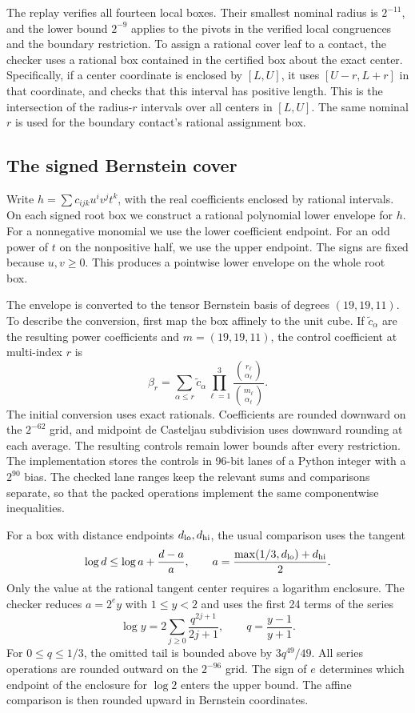 \documentclass[11pt,letterpaper]{article}
\theoremstyle{remark}
\begin{document}
The replay verifies all fourteen local boxes. Their smallest
nominal radius is \(2^{-11}\), and the lower bound \(2^{-9}\)
applies to the pivots in the verified local congruences and the
boundary restriction. To assign a rational cover leaf to a
contact, the checker uses a rational box contained in the
certified box about the exact center. Specifically, if a center
coordinate is enclosed by \([L,U]\), it uses \([U-r,L+r]\)
in that coordinate, and checks that this interval has positive
length. This is the intersection of the radius-\(r\) intervals
over all centers in \([L,U]\). The same nominal \(r\) is used
for the boundary contact's rational assignment box.

\subsection{The signed Bernstein cover}

Write \(h=\sum c_{ijk}u^iv^jt^k\), with the real coefficients
enclosed by rational intervals. On each signed root box we
construct a rational polynomial lower envelope for \(h\). For
a nonnegative monomial we use the lower coefficient endpoint.
For an odd power of \(t\) on the nonpositive half, we use the
upper endpoint. The signs are fixed because \(u,v\ge0\).
This produces a pointwise lower envelope on the whole root box.

The envelope is converted to the tensor Bernstein basis of
degrees \((19,19,11)\). To describe the conversion, first map
the box affinely to the unit cube. If \(\widetilde c_\alpha\)
are the resulting power coefficients and \(m=(19,19,11)\),
the control coefficient at multi-index \(r\) is
\[
 \beta_r=\sum_{\alpha\le r}\widetilde c_\alpha
           \prod_{\ell=1}^3
           \frac{\binom{r_\ell}{\alpha_\ell}}
                {\binom{m_\ell}{\alpha_\ell}}.
\]
The initial conversion uses exact rationals. Coefficients are
rounded downward on the \(2^{-62}\) grid, and midpoint
de Casteljau subdivision uses downward rounding at each average.
The resulting controls remain lower bounds after every restriction.
The implementation stores the controls in 96-bit lanes of a
Python integer with a \(2^{90}\) bias. The checked lane ranges
keep the relevant sums and comparisons separate, so that the
packed operations implement the same componentwise inequalities.

For a box with distance endpoints \(d_{\rm lo},d_{\rm hi}\),
the usual comparison uses the tangent
\[
 \log d\le \log a+\frac{d-a}{a},
 \qquad a=\frac{\max(1/3,d_{\rm lo})+d_{\rm hi}}2.
\]
Only the value at the rational tangent center requires a logarithm
enclosure. The checker reduces \(a=2^e y\) with \(1\le y<2\)
and uses the first 24 terms of the series
\[
 \log y=2\sum_{j\ge0}\frac{q^{2j+1}}{2j+1},
 \qquad q=\frac{y-1}{y+1}.
\]
For \(0\le q\le1/3\), the omitted tail is bounded above by
\(3q^{49}/49\). All series operations are rounded outward on
the \(2^{-96}\) grid. The sign of \(e\) determines which endpoint
of the enclosure for \(\log 2\) enters the upper bound. The
affine comparison is then rounded upward in Bernstein coordinates.
\end{document}
